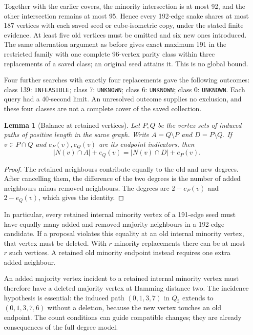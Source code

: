 \documentclass[11pt,a4paper]{article}
\newtheorem{lemma}[theorem]{Lemma}
\theoremstyle{definition}
\theoremstyle{remark}
\newcommand{\Q}{Q}
\begin{document}
Together with the earlier covers, the minority intersection is at most
92, and the other intersection remains at most 95. Hence every 192-edge
snake shares at most 187 vertices with each saved seed or cube-isometric
copy, under the stated finite evidence. At least five old vertices must
be omitted and six new ones introduced. The same alternation argument
as before gives exact maximum 191 in the restricted family with one
complete 96-vertex parity class within three replacements of a saved
class; an original seed attains it. This is no global bound.

Four further searches with exactly four replacements gave the following
outcomes: class 139: \texttt{INFEASIBLE}; class 7: \texttt{UNKNOWN}; class 6: \texttt{UNKNOWN}; class 0: \texttt{UNKNOWN}. Each query had a 40-second limit. An unresolved
outcome supplies no exclusion, and these four classes are not a complete
cover of the saved collection.

\begin{lemma}[Balance at retained vertices]\label{lem:balance236}
Let $P,Q$ be the vertex sets of induced paths of positive length in the
same graph. Write $A=Q\setminus P$ and $D=P\setminus Q$. If $v\in P\cap Q$
and $e_P(v),e_Q(v)$ are its endpoint indicators, then
\[
 |N(v)\cap A|+e_Q(v)=|N(v)\cap D|+e_P(v).
\]
\end{lemma}
\begin{proof}
The retained neighbours contribute equally to the old and new degrees.
After cancelling them, the difference of the two degrees is the number
of added neighbours minus removed neighbours. The degrees are
$2-e_P(v)$ and $2-e_Q(v)$, which gives the identity.
\end{proof}
In particular, every retained internal minority vertex of a 191-edge
seed must have equally many added and removed majority neighbours in a
192-edge candidate. If a proposal violates this equality at an old
internal minority vertex, that vertex must be deleted. With $r$ minority
replacements there can be at most $r$ such vertices. A retained old
minority endpoint instead requires one extra added neighbour.

An added majority vertex incident to a retained internal minority vertex
must therefore have a deleted majority vertex at Hamming distance two.
The incidence hypothesis is essential: the induced path $(0,1,3,7)$ in
$\Q_3$ extends to $(0,1,3,7,6)$ without a deletion, because the new vertex
touches an old endpoint. The count conditions can guide compatible
changes; they are already consequences of the full degree model.
\end{document}
